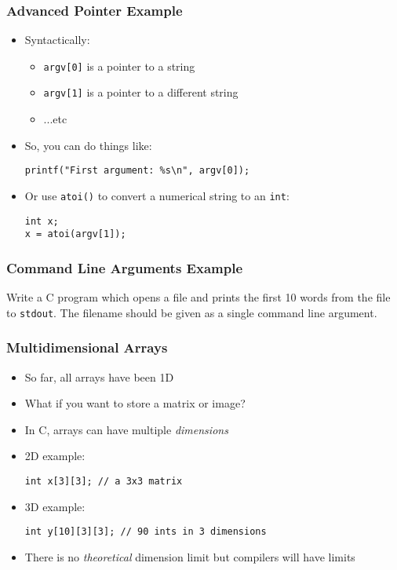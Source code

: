 \documentclass[14pt]{beamer}
\begin{document}
\begin{frame}[fragile]
\frametitle{Advanced Pointer Example}
\begin{itemize}
\item Syntactically:
	\begin{itemize}
		\item \texttt{argv[0]} is a pointer to a string
		\item \texttt{argv[1]} is a pointer to a different string
		\item ...etc
	\end{itemize}
\item So, you can do things like:
\begin{lstlisting}[style=CStyle]
printf("First argument: %s\n", argv[0]);
\end{lstlisting}
\item Or use \texttt{atoi()} to convert a numerical string to an \texttt{int}:
\begin{lstlisting}[style=CStyle]
int x;
x = atoi(argv[1]);
\end{lstlisting}
\end{itemize}
\end{frame}

\begin{frame}
\frametitle{Command Line Arguments Example}
Write a C program which opens a file and prints the first 10 words from the file to \texttt{stdout}. The filename should be given as a single command line argument.
\end{frame}

\begin{frame}[fragile]
\frametitle{Multidimensional Arrays}
\begin{itemize}
\item So far, all arrays have been 1D
\item What if you want to store a matrix or image?
\pause
\item In C, arrays can have multiple \textit{dimensions}
\item 2D example:
\begin{lstlisting}[style=CStyle]
int x[3][3]; // a 3x3 matrix
\end{lstlisting}
\item 3D example:
\begin{lstlisting}[style=CStyle]
int y[10][3][3]; // 90 ints in 3 dimensions
\end{lstlisting}
\item There is no \textit{theoretical} dimension limit but compilers will have limits
\end{itemize}
\end{frame}
\end{document}
